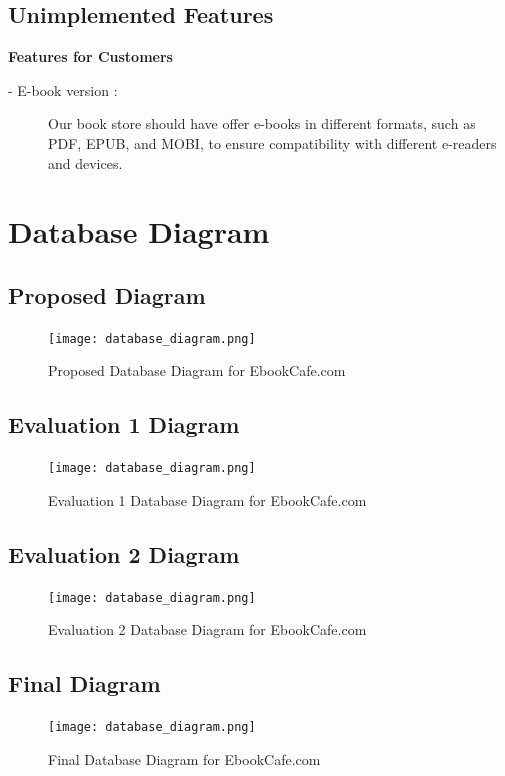 \documentclass[12pt,a4paper]{article}
\begin{document}
\subsection{Unimplemented Features}
{\large\textbf{Features for Customers}}
\begin{description}
    \item[\hspace{7mm}- E-book version :] Our book store should have offer e-books in different formats, such as PDF, EPUB, and MOBI, to ensure compatibility with different e-readers and devices.
\end{description}
\newpage
\section{Database Diagram}


\subsection{Proposed Diagram}
\begin{figure}[H]
  \centering
  \texttt{[image: database\_diagram.png]}
  \caption{Proposed Database Diagram for EbookCafe.com}
\end{figure}
\newpage
\subsection{Evaluation 1 Diagram}
\begin{figure}[H]
  \centering
  \texttt{[image: database\_diagram.png]}
  \caption{Evaluation 1 Database Diagram for EbookCafe.com}
\end{figure}
\newpage
\subsection{Evaluation 2 Diagram}
\begin{figure}[H]
  \centering
  \texttt{[image: database\_diagram.png]}
  \caption{Evaluation 2 Database Diagram for EbookCafe.com}
\end{figure}
\newpage
\subsection{Final Diagram}
\begin{figure}[H]
  \centering
  \texttt{[image: database\_diagram.png]}
  \caption{Final Database Diagram for EbookCafe.com}
\end{figure}
\newpage
\end{document}

